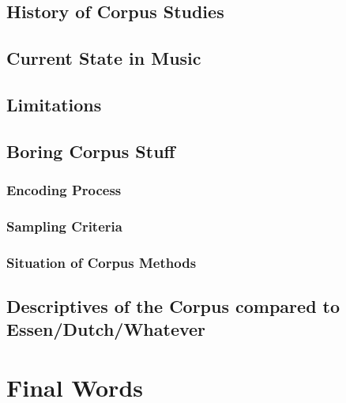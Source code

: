 \documentclass[]{book}
\theoremstyle{definition}
\theoremstyle{definition}
\theoremstyle{definition}
\theoremstyle{remark}
\begin{document}
\hypertarget{history-of-corpus-studies}{%
\section{History of Corpus Studies}\label{history-of-corpus-studies}}

\hypertarget{current-state-in-music}{%
\section{Current State in Music}\label{current-state-in-music}}

\hypertarget{limitations}{%
\section{Limitations}\label{limitations}}

\hypertarget{boring-corpus-stuff}{%
\section{Boring Corpus Stuff}\label{boring-corpus-stuff}}

\hypertarget{encoding-process}{%
\subsection{Encoding Process}\label{encoding-process}}

\hypertarget{sampling-criteria}{%
\subsection{Sampling Criteria}\label{sampling-criteria}}

\hypertarget{situation-of-corpus-methods}{%
\subsection{Situation of Corpus
Methods}\label{situation-of-corpus-methods}}

\hypertarget{descriptives-of-the-corpus-compared-to-essendutchwhatever}{%
\section{Descriptives of the Corpus compared to
Essen/Dutch/Whatever}\label{descriptives-of-the-corpus-compared-to-essendutchwhatever}}

\hypertarget{final-words}{%
\chapter{Final Words}\label{final-words}}
\end{document}

